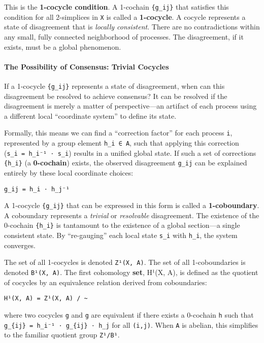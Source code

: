 \documentclass[
]{article}
\begin{document}
This is the \textbf{1-cocycle condition}. A 1-cochain \texttt{\{g\_ij\}}
that satisfies this condition for all 2-simplices in \texttt{X} is
called a \textbf{1-cocycle}. A cocycle represents a state of
disagreement that is \emph{locally consistent}. There are no
contradictions within any small, fully connected neighborhood of
processes. The disagreement, if it exists, must be a global phenomenon.

\paragraph{The Possibility of Consensus: Trivial
Cocycles}\label{the-possibility-of-consensus-trivial-cocycles}

If a 1-cocycle \texttt{\{g\_ij\}} represents a state of disagreement,
when can this disagreement be resolved to achieve consensus? It can be
resolved if the disagreement is merely a matter of perspective---an
artifact of each process using a different local ``coordinate system''
to define its state.

Formally, this means we can find a ``correction factor'' for each
process \texttt{i}, represented by a group element \texttt{h\_i\ ∈\ A},
such that applying this correction
(\texttt{s\_i\textquotesingle{}\ =\ h\_i⁻¹\ ⋅\ s\_i}) results in a
unified global state. If such a set of corrections \texttt{\{h\_i\}} (a
\textbf{0-cochain}) exists, the observed disagreement \texttt{g\_ij} can
be explained entirely by these local coordinate choices:

\texttt{g\_ij\ =\ h\_i\ ⋅\ h\_j⁻¹}

A 1-cocycle \texttt{\{g\_ij\}} that can be expressed in this form is
called a \textbf{1-coboundary}. A coboundary represents a \emph{trivial}
or \emph{resolvable} disagreement. The existence of the 0-cochain
\texttt{\{h\_i\}} is tantamount to the existence of a global section---a
single consistent state. By ``re-gauging'' each local state
\texttt{s\_i} with \texttt{h\_i}, the system converges.

The set of all 1-cocycles is denoted \texttt{Z¹(X,\ A)}. The set of all
1-coboundaries is denoted \texttt{B¹(X,\ A)}. The first cohomology
\textbf{set}, H¹(X, A), is defined as the quotient of cocycles by an
equivalence relation derived from coboundaries:

\texttt{H¹(X,\ A)\ =\ Z¹(X,\ A)\ /\ \textasciitilde{}}

where two cocycles \texttt{g} and \texttt{g\textquotesingle{}} are
equivalent if there exists a 0-cochain \texttt{h} such that
\texttt{g\textquotesingle{}\_\{ij\}\ =\ h\_i⁻¹\ ⋅\ g\_\{ij\}\ ⋅\ h\_j}
for all \texttt{(i,j)}. When \texttt{A} is abelian, this simplifies to
the familiar quotient group \texttt{Z¹/B¹}.
\end{document}
